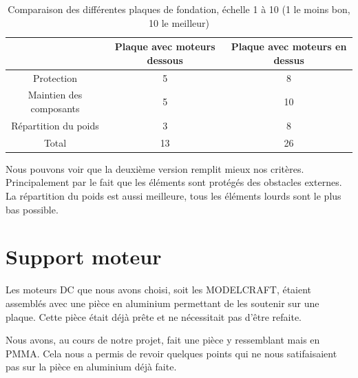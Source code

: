 \documentclass[
	a4paper,									%
	11pt,										%
	twoside,									%
	openright,									%
	notitlepage,									%
	parskip=half,								%
]{scrreprt}										%
\begin{document}
\begin{table}[!ht]
    \begin{center}
        \vspace{5mm}
        \label{tab:table4}
        \begin{tabular}{c|c|c} %
            \toprule
            \textbf{ } & \textbf{Plaque avec moteurs dessous} & \textbf{Plaque avec moteurs en dessus}\\
            \midrule
            Protection & 5 & 8\\
            Maintien des composants & 5 & 10\\
            Répartition du poids & 3 & 8 \\
			\midrule
			Total & 13 & 26\\
            \bottomrule
        \end{tabular}
    \end{center}    
	\caption{Comparaison des différentes plaques de fondation, échelle 1 à 10 (1 le moins bon, 10 le meilleur)}
\end{table}


Nous pouvons voir que la deuxième version remplit mieux nos critères. Principalement par le fait que les éléments
sont protégés des obstacles externes. La répartition du poids est aussi meilleure, tous les éléments lourds sont
le plus bas possible. \par

\section{Support moteur}

Les moteurs DC que nous avons choisi, soit les MODELCRAFT, étaient assemblés avec une pièce en aluminium permettant de
les soutenir sur une plaque. Cette pièce était déjà prête et ne nécessitait pas d'être refaite. \par

Nous avons, au cours de notre projet, fait une pièce y ressemblant mais en PMMA. Cela nous a permis de revoir quelques
points qui ne nous satifaisaient pas sur la pièce en aluminium déjà faite. \par
\end{document}
